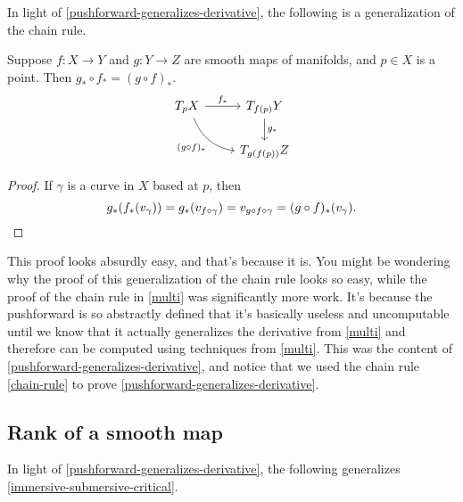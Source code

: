 In light of \cref{pushforward-generalizes-derivative}, the following is a generalization of the chain rule. 

\begin{proposition}
	Suppose $f : X \to Y$ and $g :  Y \to Z$ are smooth maps of manifolds, and $p \in X$ is a point. Then $g_* \circ f_* = (g \circ f)_*$. 
	\[ \begin{tikzcd} T_p X \ar{r}{f_*} \ar[bend right]{dr}[swap]{(g \circ f)_*} & T_{f(p)} Y \ar{d}{g_*} \\ & T_{g(f(p))} Z \end{tikzcd} \]
\end{proposition}

\begin{proof}
	If $\gamma$ is a curve in $X$ based at $p$, then 
	\[ g_*(f_*(v_\gamma)) = g_*(v_{f \circ \gamma}) = v_{g \circ f \circ \gamma} = (g \circ f)_*(v_\gamma). \qedhere \]
\end{proof}

This proof looks absurdly easy, and that's because it is. You might be wondering why the proof of this generalization of the chain rule looks so easy, while the proof of the chain rule in \cref{multi} was significantly more work. It's because the pushforward is so abstractly defined that it's basically useless and uncomputable until we know that it actually generalizes the derivative from \cref{multi} and therefore can be computed using techniques from \cref{multi}. This was the content of \cref{pushforward-generalizes-derivative}, and notice that we used the chain rule \ref{chain-rule} to prove \cref{pushforward-generalizes-derivative}. 

\subsection{Rank of a smooth map}

In light of \cref{pushforward-generalizes-derivative}, the following generalizes \cref{immersive-submersive-critical}. 

